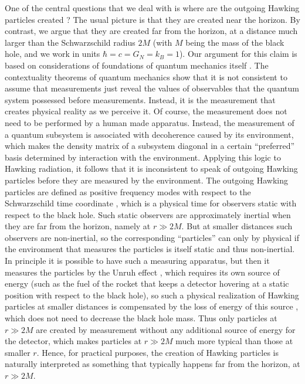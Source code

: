 \documentclass[12pt]{article}
\begin{document}
One of the central questions that we deal with is where are the outgoing Hawking particles created
\cite{unruh_where1,unruh_where2,giddings_where,hod_where}?
The usual picture is that they are created near the horizon. By contrast, we argue that they are created 
far from the horizon, at a distance much larger than the Schwarzschild radius $2M$ 
(with $M$ being the mass of the black hole, and we work in units $\hbar=c=G_N=k_B=1$).
Our argument for this claim is based on considerations of foundations of quantum mechanics itself
\cite{laloe}. The contextuality theorems of quantum mechanics \cite{KS,bell,peres,laloe}
show that it is not consistent to assume that measurements just reveal the values of observables 
that the quantum system possessed before measurements. Instead, it is the measurement that creates
physical reality as we perceive it. Of course, the measurement does not need to be performed by a human made apparatus.
Instead, the measurement of a quantum subsystem is associated with decoherence \cite{decoh1,decoh2}
caused by its environment, which makes the 
density matrix of a subsystem diagonal in a certain ``preferred'' basis determined by interaction with the environment. 
Applying this logic to Hawking radiation, 
it follows that it is inconsistent to speak of outgoing Hawking particles before they are measured
by the environment. The outgoing Hawking particles are defined as positive frequency modes with respect to the 
Schwarzschild time coordinate \cite{bd}, which is a physical time for observers static with respect to the black hole.
Such static observers are approximately inertial when they are far from the horizon, namely at $r\gg 2M$. But at smaller 
distances such observers are non-inertial, so the corresponding ``particles'' can only by physical 
if the environment that measures the particles is itself static and thus non-inertial. In principle it is possible 
to have such a measuring apparatus, but then it measures the particles by the Unruh effect \cite{unruh},
which requires its own source of energy
(such as the fuel of the rocket that keeps a detector hovering at a static position
with respect to the black hole), so such a physical realization of Hawking particles at smaller distances
is compensated by the loss of energy of this source \cite{mochizuki}, which  
does not need to decrease the black hole mass. 
Thus only particles at $r\gg 2M$ are created by measurement without any additional source of energy for the detector,
which makes particles at $r\gg 2M$ much more typical than those at smaller $r$.
Hence, for practical purposes, the creation of Hawking particles is naturally interpreted as something that typically happens 
far from the horizon, at $r\gg 2M$.
\end{document}
